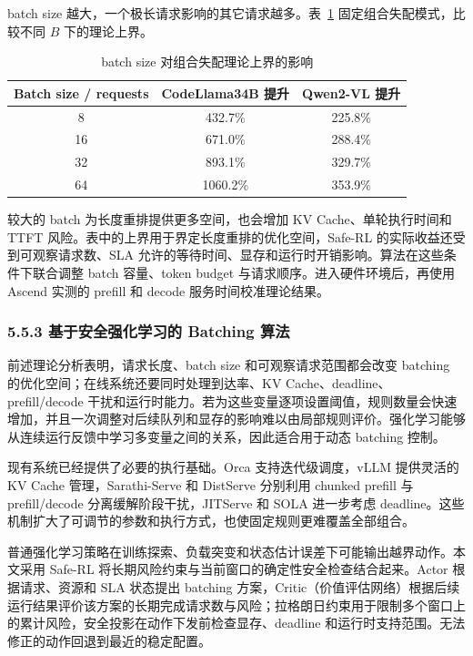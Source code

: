 batch size 越大，一个极长请求影响的其它请求越多。表~\ref{tab:ch5-batchsize-bound} 固定组合失配模式，比较不同 \(B\) 下的理论上界。

\begin{table}[!htbp]
\centering
\small
\setlength{\tabcolsep}{7pt}
\renewcommand{\arraystretch}{1.18}
\caption{batch size 对组合失配理论上界的影响}
\label{tab:ch5-batchsize-bound}
\begin{tabular}{c c c}
\hline
Batch size / requests & CodeLlama34B 提升 & Qwen2-VL 提升 \\
\hline
8  & 432.7\% & 225.8\% \\
16 & 671.0\% & 288.4\% \\
32 & 893.1\% & 329.7\% \\
64 & 1060.2\% & 353.9\% \\
\hline
\end{tabular}
\end{table}

较大的 batch 为长度重排提供更多空间，也会增加 KV Cache、单轮执行时间和 TTFT 风险。表中的上界用于界定长度重排的优化空间，Safe-RL 的实际收益还受到可观察请求数、SLA 允许的等待时间、显存和运行时开销影响。算法在这些条件下联合调整 batch 容量、token budget 与请求顺序。进入硬件环境后，再使用 Ascend 实测的 prefill 和 decode 服务时间校准理论结果。

\subsubsection*{5.5.3 基于安全强化学习的 Batching 算法}

前述理论分析表明，请求长度、batch size 和可观察请求范围都会改变 batching 的优化空间；在线系统还要同时处理到达率、KV Cache、deadline、prefill/decode 干扰和运行时能力。若为这些变量逐项设置阈值，规则数量会快速增加，并且一次调整对后续队列和显存的影响难以由局部规则评价。强化学习能够从连续运行反馈中学习多变量之间的关系，因此适合用于动态 batching 控制。

现有系统已经提供了必要的执行基础。Orca \cite{yu2022orca} 支持迭代级调度，vLLM \cite{kwon2023efficient} 提供灵活的 KV Cache 管理，Sarathi-Serve \cite{agrawal2024taming} 和 DistServe \cite{zhong2024distserve} 分别利用 chunked prefill 与 prefill/decode 分离缓解阶段干扰，JITServe \cite{zhang2026jitserve} 和 SOLA \cite{hong2025sola} 进一步考虑 deadline。这些机制扩大了可调节的参数和执行方式，也使固定规则更难覆盖全部组合。

普通强化学习策略在训练探索、负载突变和状态估计误差下可能输出越界动作。本文采用 Safe-RL 将长期风险约束与当前窗口的确定性安全检查结合起来。Actor 根据请求、资源和 SLA 状态提出 batching 方案，Critic（价值评估网络）根据后续运行结果评价该方案的长期完成请求数与风险；拉格朗日约束用于限制多个窗口上的累计风险，安全投影在动作下发前检查显存、deadline 和运行时支持范围。无法修正的动作回退到最近的稳定配置。

